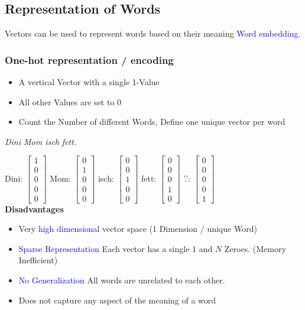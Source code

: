 \subsection{Representation of Words}
Vectors can be used to represent words based on their meaning \textcolor{blue}{Word embedding}.
\subsubsection{One-hot representation / encoding}
\begin{itemize}
    \item A vertical Vector with a single 1-Value
    \item All other Values are set to 0
    \item Count the Number of different Words, Define one unique vector per word
\end{itemize}
\textit{Dini Mom isch fett.}

Dini: $\begin{bmatrix} 1\\ 0\\ 0\\ 0\\ 0\end{bmatrix}$
Mom: $\begin{bmatrix} 0\\ 1\\ 0\\ 0\\ 0\end{bmatrix}$
isch: $\begin{bmatrix} 0\\ 0\\ 1\\ 0\\ 0\end{bmatrix}$
fett: $\begin{bmatrix} 0\\ 0\\ 0\\ 1\\ 0\end{bmatrix}$
'.': $\begin{bmatrix} 0\\ 0\\ 0\\ 0\\ 1\end{bmatrix}$\\

\textbf{Disadvantages}
\begin{itemize}
    \item Very \textcolor{blue}{high dimensional} vector space (1 Dimension / unique Word)
    \item \textcolor{blue}{Sparse Representation} Each vector has a single 1 and $N$ Zeroes. (Memory Inefficient)
    \item \textcolor{blue}{No Generalization} All words are unrelated to each other.
    \item Does not capture any aspect of the meaning of a word
\end{itemize}

